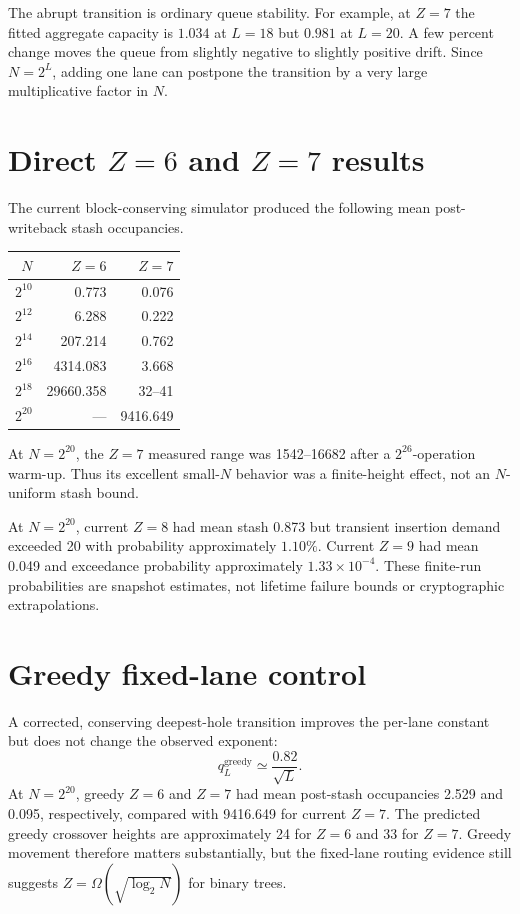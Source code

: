 \documentclass[11pt]{article}
\begin{document}
The abrupt transition is ordinary queue stability.  For example, at $Z=7$
the fitted aggregate capacity is $1.034$ at $L=18$ but $0.981$ at $L=20$.
A few percent change moves the queue from slightly negative to slightly
positive drift.  Since $N=2^L$, adding one lane can postpone the transition
by a very large multiplicative factor in $N$.

\section{Direct $Z=6$ and $Z=7$ results}

The current block-conserving simulator produced the following mean
post-writeback stash occupancies.
\begin{center}
\begin{tabular}{r@{\qquad}r@{\qquad}r}
\toprule
$N$ & $Z=6$ & $Z=7$ \\
\midrule
$2^{10}$ & 0.773 & 0.076 \\
$2^{12}$ & 6.288 & 0.222 \\
$2^{14}$ & 207.214 & 0.762 \\
$2^{16}$ & 4314.083 & 3.668 \\
$2^{18}$ & 29660.358 & 32--41 \\
$2^{20}$ & --- & 9416.649 \\
\bottomrule
\end{tabular}
\end{center}
At $N=2^{20}$, the $Z=7$ measured range was 1542--16682 after a
$2^{26}$-operation warm-up.  Thus its excellent small-$N$ behavior was a
finite-height effect, not an $N$-uniform stash bound.

At $N=2^{20}$, current $Z=8$ had mean stash 0.873 but transient insertion
demand exceeded 20 with probability approximately $1.10\%$.  Current $Z=9$
had mean 0.049 and exceedance probability approximately
$1.33\times10^{-4}$.  These finite-run probabilities are snapshot estimates,
not lifetime failure bounds or cryptographic extrapolations.

\section{Greedy fixed-lane control}

A corrected, conserving deepest-hole transition improves the per-lane
constant but does not change the observed exponent:
\[
  q_L^{\mathrm{greedy}}\simeq\frac{0.82}{\sqrt L}.
\]
At $N=2^{20}$, greedy $Z=6$ and $Z=7$ had mean post-stash occupancies 2.529
and 0.095, respectively, compared with 9416.649 for current $Z=7$.
The predicted greedy crossover heights are approximately 24 for $Z=6$ and
33 for $Z=7$.  Greedy movement therefore matters substantially, but the
fixed-lane routing evidence still suggests $Z=\Omega(\sqrt{\log_2N})$ for
binary trees.
\end{document}
